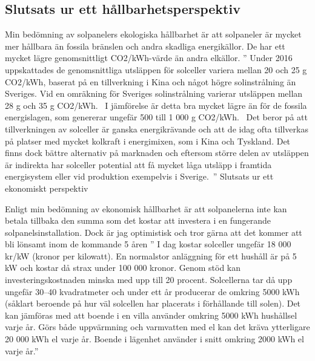 \documentclass{article}
\begin{document}
\pagebreak

\subsection{Slutsats ur ett hållbarhetsperspektiv}
Min bedömning av solpanelers ekologiska hållbarhet är att solpaneler är mycket mer hållbara än fossila bränslen och andra skadliga energikällor. De har ett mycket lägre genomsnittligt CO2/kWh-värde än andra elkällor.
” Under 2016 uppskattades de genomsnittliga utsläppen för solceller variera mellan 20 och 25 g CO2/kWh, baserat på en tillverkning i Kina och något högre solinstrålning än Sveriges. Vid en omräkning för Sveriges solinstrålning varierar utsläppen mellan 28 g och 35 g CO2/kWh. 
I jämförelse är detta bra mycket lägre än för de fossila energislagen, som genererar ungefär 500 till 1 000 g CO2/kWh.  Det beror på att tillverkningen av solceller är ganska energikrävande och att de idag ofta tillverkas på platser med mycket kolkraft i energimixen, som i Kina och Tyskland. Det finns dock bättre alternativ på marknaden och eftersom större delen av utsläppen är indirekta har solceller potential att få mycket låga utsläpp i framtida energisystem eller vid produktion exempelvis i Sverige. ”
Slutsats ur ett ekonomiskt perspektiv

Enligt min bedömning av ekonomisk hållbarhet är att solpanelerna inte kan betala tillbaka den summa som det kostar att investera i en fungerande solpanelsinstallation. Dock är jag optimistisk och tror gärna att det kommer att bli lönsamt inom de kommande 5 åren
” I dag kostar solceller ungefär 18 000 kr/kW (kronor per kilowatt). En normalstor anläggning för ett hushåll är på 5 kW och kostar då strax under 100 000 kronor. Genom stöd kan investeringskostnaden minska med upp till 20 procent. Solcellerna tar då upp ungefär 30–40 kvadratmeter och under ett år producerar de omkring 5000 kWh (såklart beroende på hur väl solcellen har placerats i förhållande till solen). Det kan jämföras med att boende i en villa använder omkring 5000 kWh hushållsel varje år. Görs både uppvärmning och varmvatten med el kan det kräva ytterligare 20 000 kWh el varje år. Boende i lägenhet använder i snitt omkring 2000 kWh el varje år.”
\pagebreak
\end{document}
